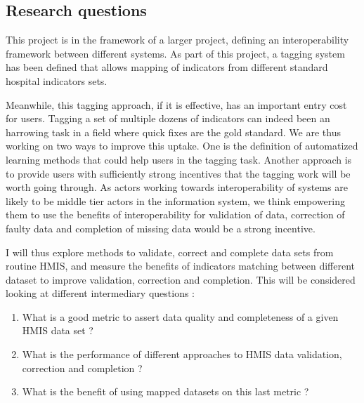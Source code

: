 \subsection{Research questions}

This project is in the framework of a larger project, defining an interoperability framework between different systems. As part of this project, a tagging system has been defined that allows mapping of indicators from different standard hospital indicators sets. %


Meanwhile, this tagging approach, if it is effective, has an important entry cost for users. Tagging a set of multiple dozens of indicators can indeed been an harrowing task in a field where quick fixes are the gold standard. %
We are thus working on two ways to improve this uptake. One is the definition of automatized learning methods that could help users in the tagging task. Another approach is to provide users with sufficiently strong incentives that the tagging work will be worth going through. As actors working towards interoperability of systems are likely to be middle tier actors in the information system, we think empowering them to use the benefits of interoperability for validation of data, correction of faulty data and completion of missing data would be a strong incentive.

I will thus explore methods to validate, correct and complete data sets from routine HMIS, and measure the benefits of indicators matching between different dataset to improve validation, correction and completion. This will be considered looking at different intermediary questions :

\begin{enumerate}
	\item What is a good metric to assert data quality and completeness of a given HMIS data set ?
	\item What is the performance of different approaches to HMIS data validation, correction and completion ?
	\item What is the benefit of using mapped datasets on this last metric ?
\end{enumerate}

